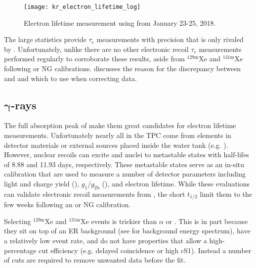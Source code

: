 \begin{figure}
\centering
\texttt{[image: kr\_electron\_lifetime\_log]}
\caption{Electron lifetime measurement using \metakr from January 23-25, 2018.}
\label{fig:electron_lifetimes_measurement_kr_elifetime}
\end{figure}

The large statistics provide $\tau_e$ measurements with precision that is only rivaled by .  Unfortunately, unlike
\alphadecays there are no other electronic recoil $\tau_e$ measurements performed regularly to corroborate these results, aside from
$\mathrm{^{129m}Xe}$ and $\mathrm{^{131m}Xe}$ following \ambe or NG calibrations.  
discusses the reason for the discrepancy between \alphadecays and \metakr and which to use when correcting data.



\subsection{$\mathbf{\gamma}$-rays}
\label{subsec:electron_lifetimes_measurement_gammas}
The full absorption peak of \gammarays make them great candidates for electron lifetime measurements.  Unfortunately nearly all
\gammarays in the TPC come from elements in detector materials or external sources placed inside the water tank
(e.g. ).  However, nuclear recoils can excite  and  nuclei to metastable states with half-lifes
of 8.88 and 11.93 days, respectively.  These metastable states serve as an in-situ calibration that are used to measure a number of
detector parameters including light and charge yield (), $g_1/g_{2\mathrm{b}}$
(), and electron lifetime.  While these evaluations can validate
electronic recoil measurements from , the short $t_{1/2}$ limit them to the few weeks following an \ambe or NG
calibration.

Selecting $\mathrm{^{129m}Xe}$ and $\mathrm{^{131m}Xe}$ events is trickier than $\alpha$ or .  This is in part because they
sit
on top of an ER background (see  for background energy spectrum), have a
relatively low event rate, and do not have properties that allow a high-percentage cut
efficiency (e.g.  delayed coincidence or high \alphadecay cS1).  Instead a number of cuts are required
to remove unwanted data before the fit.

